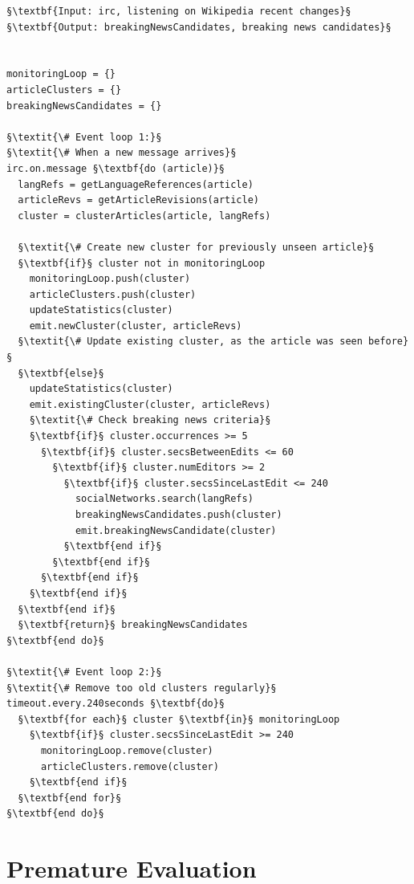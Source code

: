\documentclass{www13-companion-accepted}
\begin{document}
\begin{lstlisting}[caption=The two main event loops
  of the application,
  label=code:pseudocode, float=b!]
§\textbf{Input: irc, listening on Wikipedia recent changes}§
§\textbf{Output: breakingNewsCandidates, breaking news candidates}§


monitoringLoop = {}
articleClusters = {}
breakingNewsCandidates = {}

§\textit{\# Event loop 1:}§
§\textit{\# When a new message arrives}§
irc.on.message §\textbf{do (article)}§
  langRefs = getLanguageReferences(article)
  articleRevs = getArticleRevisions(article)
  cluster = clusterArticles(article, langRefs)

  §\textit{\# Create new cluster for previously unseen article}§
  §\textbf{if}§ cluster not in monitoringLoop
    monitoringLoop.push(cluster)
    articleClusters.push(cluster)
    updateStatistics(cluster)
    emit.newCluster(cluster, articleRevs)
  §\textit{\# Update existing cluster, as the article was seen before}§
  §\textbf{else}§
    updateStatistics(cluster)
    emit.existingCluster(cluster, articleRevs)
    §\textit{\# Check breaking news criteria}§
    §\textbf{if}§ cluster.occurrences >= 5
      §\textbf{if}§ cluster.secsBetweenEdits <= 60
        §\textbf{if}§ cluster.numEditors >= 2
          §\textbf{if}§ cluster.secsSinceLastEdit <= 240
            socialNetworks.search(langRefs)
            breakingNewsCandidates.push(cluster)
            emit.breakingNewsCandidate(cluster)
          §\textbf{end if}§
        §\textbf{end if}§
      §\textbf{end if}§
    §\textbf{end if}§
  §\textbf{end if}§
  §\textbf{return}§ breakingNewsCandidates
§\textbf{end do}§

§\textit{\# Event loop 2:}§
§\textit{\# Remove too old clusters regularly}§
timeout.every.240seconds §\textbf{do}§
  §\textbf{for each}§ cluster §\textbf{in}§ monitoringLoop
    §\textbf{if}§ cluster.secsSinceLastEdit >= 240
      monitoringLoop.remove(cluster)
      articleClusters.remove(cluster)
    §\textbf{end if}§
  §\textbf{end for}§
§\textbf{end do}§
\end{lstlisting}

\section{Premature Evaluation}
\label{sec:premature-evaluation}
\end{document}
